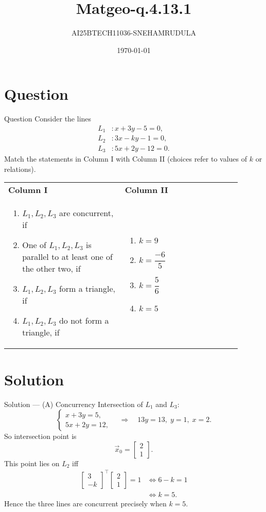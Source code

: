 \documentclass{beamer}
\title{Matgeo-q.4.13.1}
\author{AI25BTECH11036-SNEHAMRUDULA}
\date{\today}
\newcommand{\myvec}[1]{\begin{bmatrix}#1\end{bmatrix}}
\begin{document}
\begin{frame}
  \titlepage
\end{frame}

\section{Question}
\begin{frame}{Question}
Consider the lines
\[
\begin{aligned}
L_1 &: x + 3y - 5 = 0, \\
L_2 &: 3x - ky - 1 = 0, \\
L_3 &: 5x + 2y - 12 = 0.
\end{aligned}
\]
Match the statements in Column I with Column II (choices refer to values of \(k\) or relations).
\begin{center}
\begin{tabular}{p{0.45\linewidth} p{0.45\linewidth}}
\textbf{Column I} & \textbf{Column II} \\
\begin{enumerate}[label=(\Alph*)]
    \item $L_1, L_2, L_3$ are concurrent, if
    \item One of $L_1, L_2, L_3$ is parallel to at least one of the other two, if
    \item $L_1, L_2, L_3$ form a triangle, if
    \item $L_1, L_2, L_3$ do not form a triangle, if
\end{enumerate}
&
\begin{enumerate}[label=(\alph*)]
    \item $k = 9$
    \item $k = \dfrac{-6}{5}$
    \item $k = \dfrac{5}{6}$
    \item $k = 5$
\end{enumerate}
\end{tabular}
\end{center}
\end{frame}

\section{Solution}
\begin{frame}{Solution — (A) Concurrency}
Intersection of \(L_1\) and \(L_3\):
\[
\begin{cases}
x+3y=5,\\[4pt]
5x+2y=12,
\end{cases}
\quad\Rightarrow\quad 13y=13,\; y=1,\; x=2.
\]
So intersection point is
\[
\vec{x}_0=\myvec{2\\1}.
\]
This point lies on \(L_2\) iff
\[
\begin{aligned}
\myvec{3\\-k}^{\!\top}\myvec{2\\1}=1
&\iff 6-k=1\\
&\iff k=5.
\end{aligned}
\]
Hence the three lines are concurrent precisely when \(k=5\).
\end{frame}
\end{document}
